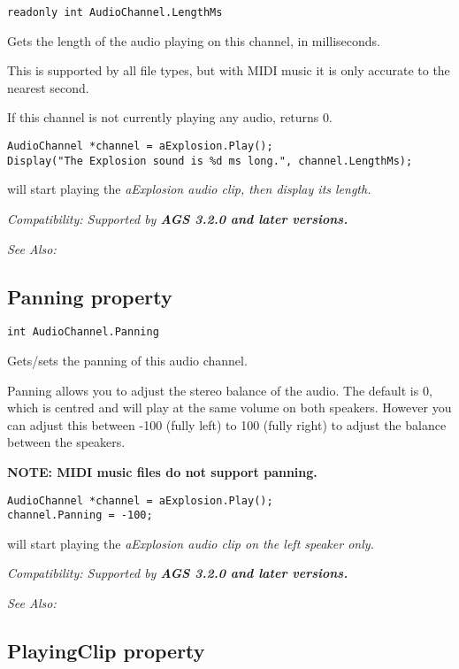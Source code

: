 \begin{verbatim}
readonly int AudioChannel.LengthMs
\end{verbatim}
Gets the length of the audio playing on this channel, in milliseconds.

This is supported by all file types, but with MIDI music it is only accurate to the nearest second.

If this channel is not currently playing any audio, returns 0.

\begin{verbatim}
AudioChannel *channel = aExplosion.Play();
Display("The Explosion sound is %d ms long.", channel.LengthMs);
\end{verbatim}
will start playing the \it{aExplosion} audio clip, then display its length.

\it{Compatibility:} Supported by \bf{AGS 3.2.0} and later versions.

\it{See Also:} 


\subsection{Panning property}\label{AudioChannel.Panning}%

\begin{verbatim}
int AudioChannel.Panning
\end{verbatim}
Gets/sets the panning of this audio channel.

Panning allows you to adjust the stereo balance of the audio. The default is 0, which is
centred and will play at the same volume on both speakers. However you can adjust this
between -100 (fully left) to 100 (fully right) to adjust the balance between the speakers.

\bf{NOTE:} MIDI music files do not support panning.

\begin{verbatim}
AudioChannel *channel = aExplosion.Play();
channel.Panning = -100;
\end{verbatim}
will start playing the \it{aExplosion} audio clip on the left speaker only.

\it{Compatibility:} Supported by \bf{AGS 3.2.0} and later versions.

\it{See Also:} 


\subsection{PlayingClip property}\label{AudioChannel.PlayingClip}%

